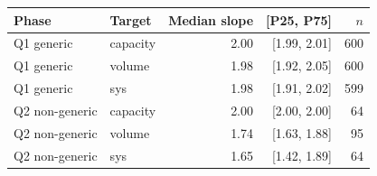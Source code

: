 \begin{tabular}{l l r r r}
\toprule
Phase & Target & Median slope & [P25, P75] & $n$ \\
\midrule
Q1 generic & capacity & 2.00 & [1.99, 2.01] & 600 \\
Q1 generic & volume & 1.98 & [1.92, 2.05] & 600 \\
Q1 generic & sys & 1.98 & [1.91, 2.02] & 599 \\
\midrule
Q2 non-generic & capacity & 2.00 & [2.00, 2.00] & 64 \\
Q2 non-generic & volume & 1.74 & [1.63, 1.88] & 95 \\
Q2 non-generic & sys & 1.65 & [1.42, 1.89] & 64 \\
\bottomrule
\end{tabular}
